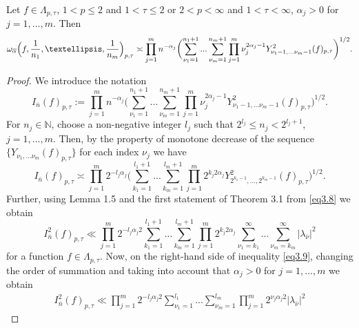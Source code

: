 \documentclass[10pt,a4paper]{amsart}
\begin{document}
\begin{theorem}\label{th3.3} 
Let  $f \in \Lambda_{p, \tau}$, $1<p\leqslant 2$ and $1<\tau \leqslant 2$ or $2< p<\infty$ and $1<\tau <\infty$, $\alpha_{j}> 0$ for $j=1,\ldots,m$. Then
 \begin{equation*}  
\omega_{\overline\alpha}\Bigl(f,\frac{1}{n_{1}},\ldots, \frac{1}{n_{m}}\Bigr)_{p, \tau}  \asymp
\prod_{j=1}^{m}n^{-\alpha_{j}}\biggl(\sum\limits_{\nu_{1}=1}^{n_{1}+1}...\sum\limits_{\nu_{m}=1}^{n_{m}+1}\prod_{j=1}^{m}\nu_{j}^{2\alpha_{j}-1} Y_{\nu_{1}-1,... \nu_{m}-1}^{2}(f)_{p, \tau} \biggr)^{1/2}.
\end{equation*}
 \end{theorem}

\begin{proof}
We introduce the notation  
 \begin{equation*}
 I_{\overline{n}}(f)_{p, \tau}:=\prod_{j=1}^{m}n^{-\alpha_{j}}\biggl(\sum\limits_{\nu_{1}=1}^{n_{1}+1}...\sum\limits_{\nu_{m}=1}^{n_{m}+1}\prod_{j=1}^{m}\nu_{j}^{2\alpha_{j}-1} Y_{\nu_{1}-1,... \nu_{m}-1}^{2}(f)_{p, \tau} \biggr)^{1/2}.
 \end{equation*}
For $n_{j}\in \mathbb{N}$, choose a non-negative integer $l_{j}$ such that $2^{l_{j}}\leqslant n_{j}< 2^{l_{j}+1}$, $j=1,\ldots,m$. Then, by the property of monotone decrease of the sequence $\{Y_{\nu_{1},... \nu_{m}}(f)_{p, \tau}\}$ for each index $\nu_{j}$ we have
  \begin{equation}\label{eq3.8}
 I_{\overline{n}}(f)_{p, \tau} \asymp \prod_{j=1}^{m}2^{-l_{j}\alpha_{j}}\biggl(\sum\limits_{k_{1}=1}^{l_{1}+1}...\sum\limits_{k_{m}=1}^{l_{m}+1}\prod_{j=1}^{m}2^{k_{j}2\alpha_{j}}Y_{2^{k_{1}-1},... ,2^{k_{m}-1}}^{2}(f)_{p, \tau} \biggr)^{1/2}.
\end{equation} 
Further, using Lemma 1.5 and the first statement of Theorem 3.1 from \eqref{eq3.8} we obtain 
   \begin{equation}\label{eq3.9}
 I_{\overline{n}}^{2}(f)_{p, \tau} \ll \prod_{j=1}^{m}2^{-l_{j}\alpha_{j}2}\sum\limits_{k_{1}=1}^{l_{1}+1}...\sum\limits_{k_{m}=1}^{l_{m}+1}\prod_{j=1}^{m}2^{k_{j}2\alpha_{j}}\sum\limits_{\nu_{1}=k_{1}}^{\infty}...\sum\limits_{\nu_{m}=k_{m}}^{\infty}|\lambda_{\overline{\nu}}|^{2} 
\end{equation} 
for a function 
 $f \in \Lambda_{p ,\tau}$.
Now, on the right-hand side of inequality \eqref{eq3.9}, changing the order of summation and taking into account that $\alpha_{j}>0$ for $j=1,\ldots,m$ we obtain
    \begin{multline}\label{eq3.10}
 I_{\overline{n}}^{2}(f)_{p, \tau} \ll \prod_{j=1}^{m}2^{-l_{j}\alpha_{j}2}\sum\limits_{\nu_{1}=1}^{l_{1}}...\sum\limits_{\nu_{m}=1}^{l_{m}}\prod_{j=1}^{m}2^{\nu_{j}\alpha_{j}2}|\lambda_{\overline{\nu}}|^{2}

\end{multline}
\end{proof}
\end{document}
